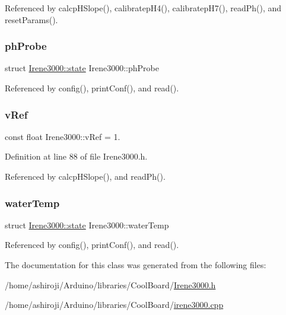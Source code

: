 Referenced by calcp\+H\+Slope(), calibratep\+H4(), calibratep\+H7(), read\+Ph(), and reset\+Params().

\mbox{\label{classIrene3000_a997a4ee466fa1d5416e07e444965dc9e}} 
\subsubsection{\texorpdfstring{ph\+Probe}{phProbe}}
{\footnotesize\ttfamily struct \hyperlink{structIrene3000_1_1state}{Irene3000\+::state}  Irene3000\+::ph\+Probe\hspace{0.3cm}{\ttfamily [private]}}



Referenced by config(), print\+Conf(), and read().

\mbox{\label{classIrene3000_a018e7ff9bee57e6d2b298667a668ba7e}} 
\subsubsection{\texorpdfstring{v\+Ref}{vRef}}
{\footnotesize\ttfamily const float Irene3000\+::v\+Ref = 1.\hspace{0.3cm}{\ttfamily [private]}}



Definition at line 88 of file Irene3000.\+h.



Referenced by calcp\+H\+Slope(), and read\+Ph().

\mbox{\label{classIrene3000_af05612c78c758ce9db316c75ad937130}} 
\subsubsection{\texorpdfstring{water\+Temp}{waterTemp}}
{\footnotesize\ttfamily struct \hyperlink{structIrene3000_1_1state}{Irene3000\+::state}  Irene3000\+::water\+Temp\hspace{0.3cm}{\ttfamily [private]}}



Referenced by config(), print\+Conf(), and read().



The documentation for this class was generated from the following files\+:\begin{DoxyCompactItemize}
\item 
/home/ashiroji/\+Arduino/libraries/\+Cool\+Board/\hyperlink{Irene3000_8h}{Irene3000.\+h}\item 
/home/ashiroji/\+Arduino/libraries/\+Cool\+Board/\hyperlink{irene3000_8cpp}{irene3000.\+cpp}\end{DoxyCompactItemize}
